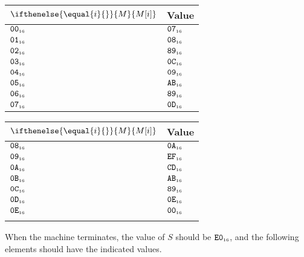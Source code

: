 \documentclass[a4paper,12pt]{article}
\newcommand{\num}[1]{\texttt{#1}}
\newcommand{\hex}[1]{\num{#1}_{\textup{\tiny 16}}}
\newcommand{\MEM}[1]{\ifthenelse{\equal{#1}{}}{M}{M[#1]}}
\newcommand{\SP}{S}
\begin{document}
\begin{center}
  \begin{tabular}{@{}ll@{}}
    \hline
    $\MEM{i}$  & Value \\
    \hline
    $\hex{00}$ & $\hex{07}$ \\
    $\hex{01}$ & $\hex{08}$ \\
    $\hex{02}$ & $\hex{89}$ \\
    $\hex{03}$ & $\hex{0C}$ \\
    $\hex{04}$ & $\hex{09}$ \\
    $\hex{05}$ & $\hex{AB}$ \\
    $\hex{06}$ & $\hex{89}$ \\
    $\hex{07}$ & $\hex{0D}$ \\
    \hline
  \end{tabular}
  \hfil
  \begin{tabular}{@{}ll@{}}
    \hline
    $\MEM{i}$  & Value \\
    \hline
    $\hex{08}$ & $\hex{0A}$ \\
    $\hex{09}$ & $\hex{EF}$ \\
    $\hex{0A}$ & $\hex{CD}$ \\
    $\hex{0B}$ & $\hex{AB}$ \\
    $\hex{0C}$ & $\hex{89}$ \\
    $\hex{0D}$ & $\hex{0E}$ \\
    $\hex{0E}$ & $\hex{00}$ \\
    \\
    \hline
  \end{tabular}
\end{center}

When the machine terminates, the value of $\SP$ should be $\hex{E0}$, and the following elements should have the indicated values.
\end{document}
